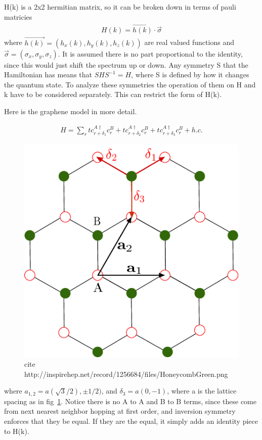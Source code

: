 H(k) is a 2x2 hermitian matrix, so it can be broken down in terms of pauli matricies
\begin{align}
H(k)=\vec{h(k)}\cdot \vec{\sigma}
\end{align}
where $\vec{h(k)} = (h_x(k),h_y(k),h_z(k))$ are real valued functions and $\vec{\sigma} = (\sigma_x,\sigma_y,\sigma_z)$. It is assumed there is no part proportional to the identity, since this would just shift the spectrum up or down. Any symmetry S that the Hamiltonian has means that $SHS^{-1}=H$, where S is defined by how it changes the quantum state. To analyze these symmetries the operation of them on H and k have to be considered separately. This can restrict the form of H(k).

Here is the graphene model in more detail. 

\begin{align}
H=\sum_{r} t c^{A\dag}_{r+\delta_1}c^B_r+ t c^{A\dag}_{r+\delta_2}c^B_r+ t c^{A\dag}_{r+\delta_3}c^B_r +h.c.
\end{align}
\begin{figure}
	\centering
	\includegraphics[width=0.5\linewidth]{images/HoneycombGreen}
	\caption{cite http://inspirehep.net/record/1256684/files/HoneycombGreen.png}
	\label{fig:honeycombgreen}
\end{figure}


where $a_{1,2} =a(\sqrt{3}/2),\pm1/2)$, and $\delta_3 =a(0,-1) $, where a is the lattice spacing as in fig~\ref{fig:honeycombgreen}. Notice there is no A to A and B to B terms, since these come from next nearest neighbor hopping at first order, and inversion symmetry enforces that they be equal. If they are the equal, it simply adds an identity piece to H(k).

